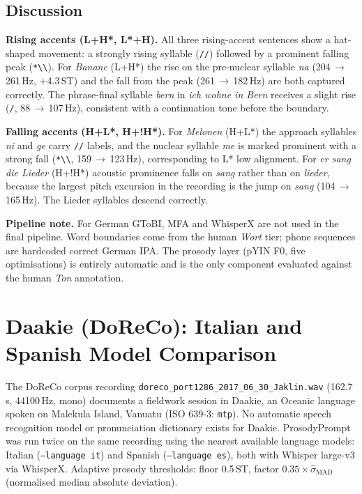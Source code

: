 \section*{Discussion}

\textbf{Rising accents (L+H*, L*+H).}
All three rising-accent sentences show a hat-shaped movement:
a strongly rising syllable (\texttt{//}) followed by a prominent falling peak
(\texttt{*\textbackslash\textbackslash}).
For \textit{Banane} (L+H*) the rise on the pre-nuclear syllable \textit{na}
(204\,$\to$\,261\,Hz, $+$4.3\,ST) and the fall from the peak
(261\,$\to$\,182\,Hz) are both captured correctly.
The phrase-final syllable \textit{bern} in \textit{ich wohne in Bern}
receives a slight rise (\texttt{/}, 88\,$\to$\,107\,Hz), consistent with a
continuation tone before the boundary.

\textbf{Falling accents (H+L*, H+!H*).}
For \textit{Melonen} (H+L*) the approach syllables \textit{ni} and \textit{ge}
carry \texttt{//} labels, and the nuclear syllable \textit{me} is marked
prominent with a strong fall (\texttt{*\textbackslash\textbackslash},
159\,$\to$\,123\,Hz), corresponding to L* low alignment.
For \textit{er sang die Lieder} (H+!H*) acoustic prominence falls on
\textit{sang} rather than on \textit{lieder}, because the largest pitch
excursion in the recording is the jump on \textit{sang} (104\,$\to$\,165\,Hz).
The Lieder syllables descend correctly.

\textbf{Pipeline note.}
For German GToBI, MFA and WhisperX are not used in the final pipeline. Word
boundaries come from the human \textit{Wort} tier; phone sequences are
hardcoded correct German IPA. The prosody layer (pYIN F0, five optimisations)
is entirely automatic and is the only component evaluated against the
human \textit{Ton} annotation.


\chapter{Daakie (DoReCo): Italian and Spanish Model Comparison}
\label{app:daakie}

The DoReCo corpus recording
\texttt{doreco\_port1286\_2017\_06\_30\_Jaklin.wav} (162.7\,s, 44100\,Hz, mono)
documents a fieldwork session in Daakie, an Oceanic language spoken on Malekula
Island, Vanuatu (ISO 639-3: \texttt{mtp}).
No automatic speech recognition model or pronunciation dictionary exists for Daakie.
ProsodyPrompt was run twice on the same recording using the nearest available
language models: Italian (\texttt{--language it}) and Spanish
(\texttt{--language es}), both with Whisper large-v3 via WhisperX.
Adaptive prosody thresholds: floor 0.5\,ST,
factor $0.35 \times \hat{\sigma}_\mathrm{MAD}$ (normalised median absolute deviation).

